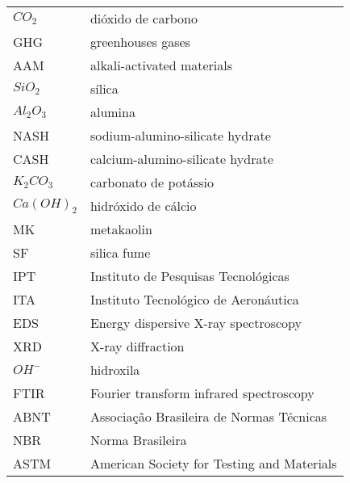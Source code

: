 \begin{longtable}{ll}
$CO_2$ & dióxido de carbono \\
GHG & greenhouses gases \\
AAM & alkali-activated materials \\
$ SiO_2$ & sílica \\
$ Al_2O_3$ & alumina \\
NASH & sodium-alumino-silicate hydrate \\
CASH & calcium-alumino-silicate hydrate \\
$K_2CO_3$ & carbonato de potássio \\
$Ca(OH)_2$ & hidróxido de cálcio \\
MK & metakaolin \\
SF & silica fume \\
IPT & Instituto de Pesquisas Tecnológicas \\
ITA & Instituto Tecnológico de Aeronáutica \\
EDS & Energy dispersive X-ray spectroscopy \\
XRD & X-ray diffraction \\
$OH^-$ & hidroxila \\
FTIR & Fourier transform infrared spectroscopy \\
ABNT & Associação Brasileira de Normas Técnicas \\
NBR & Norma Brasileira \\
ASTM & American Society for Testing and Materials \\

\end{longtable}

